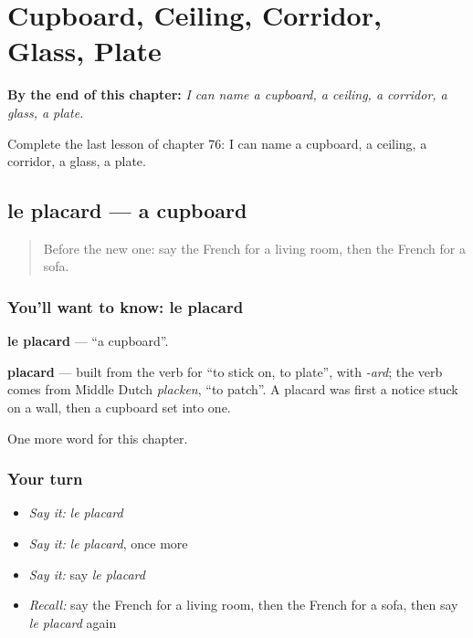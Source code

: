 
\chapter{Cupboard, Ceiling, Corridor, Glass, Plate}
\label{ch:fr-cupboard-ceiling-corridor-glass-plate}

\begin{chapteropening}
\textbf{By the end of this chapter:} \emph{I can name a cupboard, a ceiling, a corridor, a glass, a plate.}

Complete the last lesson of chapter 76: I can name a cupboard, a ceiling, a corridor, a glass, a plate.
\end{chapteropening}

\section[le placard]{le placard — a cupboard}

\label{lesson:FR-C76-placard}



\begin{quote}
Before the new one: say the French for a living room, then the French for a sofa.
\end{quote}

\subsection*{You'll want to know: le placard}
\textbf{le placard} — \textquotedblleft{}a cupboard\textquotedblright{}.

\begin{cousinweb}
\textbf{placard} — built from the verb for \textquotedblleft{}to stick on, to plate\textquotedblright{}, with \emph{-ard}; the verb comes from Middle Dutch \emph{placken}, \textquotedblleft{}to patch\textquotedblright{}. A placard was first a notice stuck on a wall, then a cupboard set into one.
\end{cousinweb}

\begin{grammarlens}[title={What you've built}]
One more word for this chapter.
\end{grammarlens}

\subsection*{Your turn}
\begin{itemize}
\raggedright
  \item \emph{Say it:} \emph{le placard}
  \item \emph{Say it:} \emph{le placard}, once more
  \item \emph{Say it:} say \emph{le placard}
  \item \emph{Recall:} say the French for a living room, then the French for a sofa, then say \emph{le placard} again
\end{itemize}

